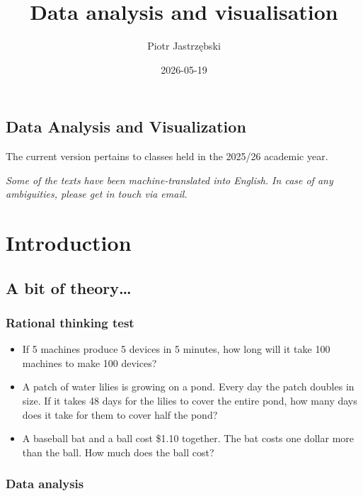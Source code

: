 \documentclass[
  english,
  letterpaper,
  DIV=11,
  numbers=noendperiod]{scrreprt}
\title{Data analysis and visualisation}
\author{Piotr Jastrzębski}
\date{2026-05-19}
\providecommand{\tightlist}{%
  \setlength{\itemsep}{0pt}\setlength{\parskip}{0pt}}
\renewcommand*\contentsname{Table of contents}
\newcommand\contentsname{Table of contents}
\begin{document}
\maketitle

\renewcommand*\contentsname{Table of contents}
{
\setcounter{tocdepth}{2}
\tableofcontents
}

\chapter{Data Analysis and
Visualization}\label{data-analysis-and-visualization}

The current version pertains to classes held in the 2025/26 academic
year.

\emph{Some of the texts have been machine-translated into English. In
case of any ambiguities, please get in touch via email.}

\part{Introduction}

\chapter{A bit of theory\ldots{}}\label{a-bit-of-theory}

\section{Rational thinking test}\label{rational-thinking-test}

\begin{itemize}
\tightlist
\item
  If 5 machines produce 5 devices in 5 minutes, how long will it take
  100 machines to make 100 devices?
\item
  A patch of water lilies is growing on a pond. Every day the patch
  doubles in size. If it takes 48 days for the lilies to cover the
  entire pond, how many days does it take for them to cover half the
  pond?
\item
  A baseball bat and a ball cost \$1.10 together. The bat costs one
  dollar more than the ball. How much does the ball cost?
\end{itemize}

\section{Data analysis}\label{data-analysis}
\end{document}
